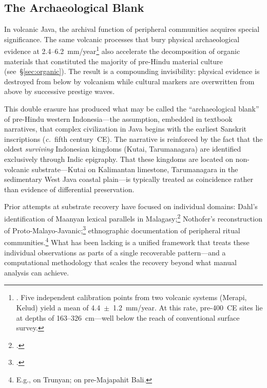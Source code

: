 \documentclass[12pt,a4paper]{article}
\begin{document}
\subsection{The Archaeological Blank}

In volcanic Java, the archival function of peripheral communities acquires special significance. The same volcanic processes that bury physical archaeological evidence at 2.4--6.2~mm/year\footnote{\autocite{amien2026a}. Five independent calibration points from two volcanic systems (Merapi, Kelud) yield a mean of 4.4~$\pm$~1.2~mm/year. At this rate, pre-400~CE sites lie at depths of 163--326~cm---well below the reach of conventional surface survey.} also accelerate the decomposition of organic materials that constituted the majority of pre-Hindu material culture (see~\S\ref{sec:organic}). The result is a compounding invisibility: physical evidence is destroyed from below by volcanism while cultural markers are overwritten from above by successive prestige waves.

This double erasure has produced what may be called the ``archaeological blank'' of pre-Hindu western Indonesia---the assumption, embedded in textbook narratives, that complex civilization in Java begins with the earliest Sanskrit inscriptions (\textit{c.}~fifth century~CE). The narrative is reinforced by the fact that the oldest \emph{surviving} Indonesian kingdoms (Kutai, Tarumanagara) are identified exclusively through Indic epigraphy. That these kingdoms are located on non-volcanic substrate---Kutai on Kalimantan limestone, Tarumanagara in the sedimentary West Java coastal plain---is typically treated as coincidence rather than evidence of differential preservation.

Prior attempts at substrate recovery have focused on individual domains: Dahl's identification of Maanyan lexical parallels in Malagasy;\footnote{\autocite{dahl1951malgache}.} Nothofer's reconstruction of Proto-Malayo-Javanic;\footnote{\autocite{nothofer1975reconstruction}.} ethnographic documentation of peripheral ritual communities.\footnote{E.g., \autocite{danandjaja1980kebudayaan} on Trunyan; \autocite{covarrubias1937bali} on pre-Majapahit Bali.} What has been lacking is a unified framework that treats these individual observations as parts of a single recoverable pattern---and a computational methodology that scales the recovery beyond what manual analysis can achieve.
\end{document}
